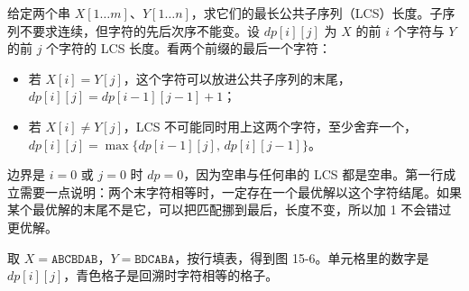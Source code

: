 给定两个串 $X[1\ldots m]$、$Y[1\ldots n]$，求它们的最长公共子序列（LCS）长度。子序列不要求连续，但字符的先后次序不能变。设 $dp[i][j]$ 为 $X$ 的前 $i$ 个字符与 $Y$ 的前 $j$ 个字符的 LCS 长度。看两个前缀的最后一个字符：

\begin{itemize}
  \item 若 $X[i]=Y[j]$，这个字符可以放进公共子序列的末尾，$dp[i][j]=dp[i-1][j-1]+1$；
  \item 若 $X[i]\ne Y[j]$，LCS 不可能同时用上这两个字符，至少舍弃一个，$dp[i][j]=\max\{dp[i-1][j],\,dp[i][j-1]\}$。
\end{itemize}

边界是 $i=0$ 或 $j=0$ 时 $dp=0$，因为空串与任何串的 LCS 都是空串。第一行成立需要一点说明：两个末字符相等时，一定存在一个最优解以这个字符结尾。如果某个最优解的末尾不是它，可以把匹配挪到最后，长度不变，所以加 1 不会错过更优解。

取 $X=\texttt{ABCBDAB}$，$Y=\texttt{BDCABA}$，按行填表，得到图 15-6。单元格里的数字是 $dp[i][j]$，青色格子是回溯时字符相等的格子。

